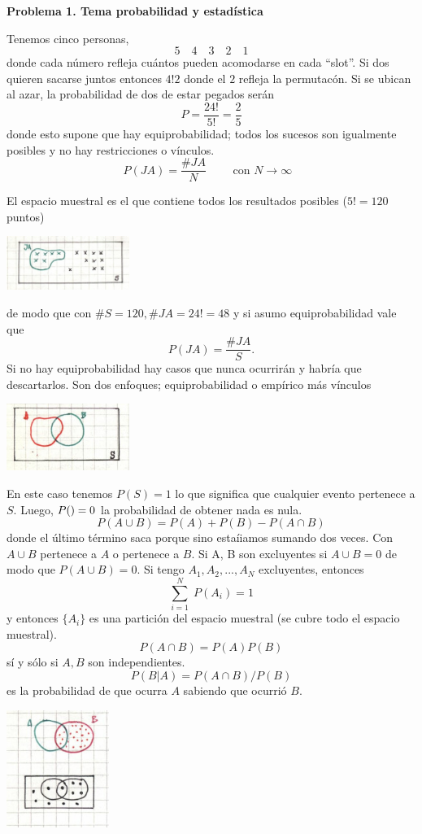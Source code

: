 \documentclass[10pt,oneside]{CBFT_book}
\begin{document}
\begin{ejemplo}{\bf Problema 1. Tema probabilidad y estadística}

Tenemos cinco personas,
\[
	5 \quad 4 \quad 3 \quad 2 \quad 1
\]
donde cada número refleja cuántos pueden acomodarse en cada ``slot''. Si dos quieren
sacarse juntos entonces $4!2$ donde el $2$ refleja la permutacón.
Si se ubican al azar, la probabilidad de dos de estar pegados serán
\[
	P= \frac{2 4!}{5!} = \frac{2}{5}
\]
donde esto supone que hay equiprobabilidad; todos los sucesos son igualmente posibles y no 
hay restricciones o vínculos.
\[
	P(JA) = \frac{\# JA}{N} \qquad \text{ con $N\to\infty$ }
\]

El espacio muestral es el que contiene todos los resultados posibles ($5!=120$ puntos)

\includegraphics[width=0.30\textwidth]{images/1606329144.jpg}

de modo que con $\#S = 120, \#JA = 24! = 48$ y si asumo equiprobabilidad vale que 
\[
	P(JA) = \frac{\# JA}{S}.
\]
Si no hay equiprobabilidad hay casos que nunca ocurrirán y habría que descartarlos.
Son dos enfoques; equiprobabilidad o empírico más vínculos

\includegraphics[width=0.30\textwidth]{images/1606329147.jpg}

En este caso tenemos $P(S)=1$ lo que significa que cualquier evento pertenece a $S$.
Luego,  $P(\null)=0$ la probabilidad de obtener nada es nula.
\[
	P(A\cup B) = P(A) + P(B) - P(A\cap B)
\]
donde el último término saca porque sino estaíiamos sumando dos veces.
Con $A\cup B$ pertenece a $A$ o pertenece a $B$.
Si A, B son excluyentes si $A\cup B = 0$ de modo que $P(A\cup B)=0$. Si tengo $A_1,A_2,...,A_N$
excluyentes, entonces
\[
	\sum_{i=1}^N \; P(A_i) = 1
\]
y entonces $\{A_i\}$ es una partición del espacio muestral (se cubre todo el espacio muestral).
\[
	P(A\cap B) = P(A) P(B)
\]
sí y sólo si $A,B$ son independientes.
\[
	P(B|A) = P(A\cap B)/P(B)
\]
es la probabilidad de que ocurra $A$ sabiendo que ocurrió $B$.

\includegraphics[width=0.25\textwidth]{images/1606329152.jpg}


\end{ejemplo}
\end{document}

